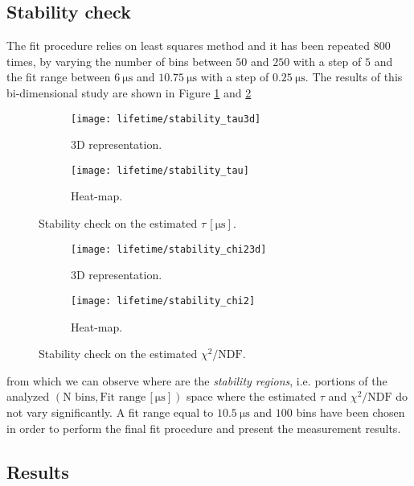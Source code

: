 \subsection{Stability check}
The fit procedure relies on least squares method and it has been repeated $800$ times, by varying the number of bins between $50$ and $250$ with a step of $5$ and the fit range between $\SI{6}{\micro\second}$ and $\SI{10.75}{\micro\second}$ with a step of $\SI{0.25}{\micro\second}$. The results of this bi-dimensional study are shown in Figure \ref{fig:stabtau} and \ref{fig:stabchi2}
\begin{figure}[!htp]
	\centering
	\begin{subfigure}{.5\linewidth}
		\centering
		\texttt{[image: lifetime/stability\_tau3d]}
		\caption{3D representation.}
	\end{subfigure}\hfill
	\begin{subfigure}{.5\linewidth}
		\centering
		\texttt{[image: lifetime/stability\_tau]}
		\caption{Heat-map.}
	\end{subfigure}
	\caption{Stability check on the estimated $\tau\,\left[\si{\micro\second}\right]$.}\label{fig:stabtau}
\end{figure}
\begin{figure}[!htp]
	\centering
	\begin{subfigure}{.5\linewidth}
		\centering
		\texttt{[image: lifetime/stability\_chi23d]}
		\caption{3D representation.}
	\end{subfigure}\hfill
	\begin{subfigure}{.5\linewidth}
		\centering
		\texttt{[image: lifetime/stability\_chi2]}
		\caption{Heat-map.}
	\end{subfigure}
	\caption{Stability check on the estimated $\chi^2/\textrm{NDF}$.}\label{fig:stabchi2}
\end{figure}
from which we can observe where are the \emph{stability regions}, i.e. portions of the analyzed $\left(\textrm{N bins}, \textrm{Fit range}\,\left[\si{\micro\second}\right]\right)$ space where the estimated $\tau$ and $\chi^2/\textrm{NDF}$ do not vary significantly. A fit range equal to $\SI{10.5}{\micro\second}$ and $100$ bins have been chosen in order to perform the final fit procedure and present the measurement results.


\subsection{Results}\label{subsect::results}

